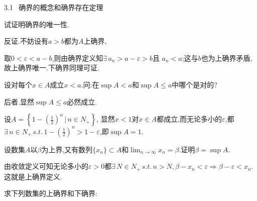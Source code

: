 \documentclass{exam}
\begin{document}
\begin{center}
    \Large 3.1 \, 确界的概念和确界存在定理
\end{center}

\begin{questions}
    \question
    试证明确界的唯一性.
    \begin{solution}
        反证.不妨设有$a>b$都为$A$上确界,

        取$0<\varepsilon<a-b$,则由确界定义知$\exists\, a_n>a-\varepsilon>b$且
        $a_n<a$;这与$b$也为上确界矛盾,故上确界唯一.下确界同理可证.
    \end{solution}

    \question
    设对每个$x\in A$成立$x<a$.问:在$\sup A<a$和$\sup A\leqslant a$中哪个是对的?
    \begin{solution}
        后者.显然$\sup A\leqslant a$必然成立.
        
        设$A=\left\{1-(\frac{1}{2})^n\,\bigg\lvert\,n\in N_+\right\}$,
        显然$x<1$对$x\in A$都成立,而无论多小的$\varepsilon$,都$\exists
        \,n\in N_+\,s.t.\,1-(\frac{1}{2})^n>1-\varepsilon$,即$\sup A=1$.
    \end{solution}
    \question
    设数集$A$以$\beta$为上界,又有数列$\{x_n\}\subset A$和$\lim_{n\to\infty}x_n=\beta.$证明$\beta=\sup A$.
    \begin{solution}
        由收敛定义可知无论多小的$\varepsilon>0$都$\exists\,N\in N_+
        \,s.t.\,n>N,\beta-x_n<\varepsilon\Rightarrow\beta-\varepsilon<x_n$.
        这就是上确界定义.
    \end{solution}
    \question
    求下列数集的上确界和下确界:
\end{questions}
\end{document}
